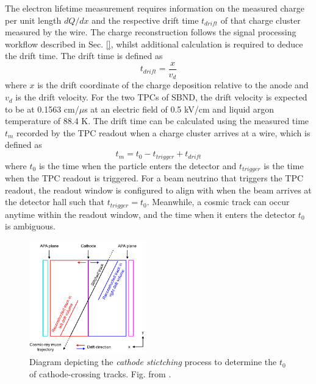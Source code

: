 The electron lifetime measurement requires information on the measured charge per unit length $dQ/dx$ and the respective drift time $t_{drift}$ of that charge cluster measured by the wire.
The charge reconstruction follows the signal processing workflow described in Sec. \ref{}, whilst additional calculation is required to deduce the drift time.     
The drift time is defined as 
\begin{equation}
        t_{drift} = \frac{x}{v_{d}}
\end{equation}
where $x$ is the drift coordinate of the charge deposition relative to the anode and $v_{d}$ is the drift velocity.
For the two TPCs of SBND, the drift velocity is expected to be at 0.1563 cm/$\mu$s at an electric field of 0.5 kV/cm and liquid argon temperature of 88.4 K.
The drift time can be calculated using the measured time $t_{m}$ recorded by the TPC readout when a charge cluster arrives at a wire, which is defined as \cite{pandora_protodune}
\begin{equation}
\label{eq:t0}
        t_{m} = t_{0} - t_{trigger} + t_{drift} 
\end{equation}
where $t_{0}$ is the time when the particle enters the detector and $t_{trigger}$ is the time when the TPC readout is triggered.
For a beam neutrino that triggers the TPC readout, the readout window is configured to align with when the beam arrives at the detector hall such that $t_{trigger} = t_{0}$.
Meanwhile, a cosmic track can occur anytime within the readout window, and the time when it enters the detector $t_{0}$ is ambiguous.

\begin{figure}[bp!] 
\centering    
\includegraphics[width=0.45\textwidth]{cosmic_stitch}
\caption[cosmic_stitch]{
	Diagram depicting the \textit{cathode stictching} process to determine the $t_{0}$ of cathode-crossing tracks.
	Fig. from \cite{pandora_protodune}.
}
\label{fig:cosmic_stitch}
\end{figure}

